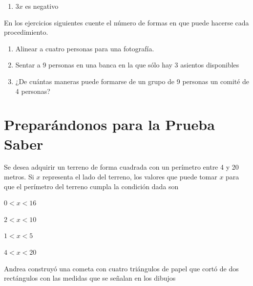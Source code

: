 \documentclass[fleqn]{article}
\begin{document}
\begin{enumerate}
\begin{enumerate}
    \item $3x$ es negativo 
  \end{enumerate}
    \item En los ejercicios siguientes cuente el número de formas en que puede hacerse cada procedimiento.
  \begin{enumerate}
  \item Alinear a cuatro personas para una fotografía.
  \item Sentar a 9 personas en una banca en la que sólo hay 3 asientos disponibles
  \item ¿De cuántas maneras puede formarse de un grupo de 9 personas un comité de 4 personas?
  \end{enumerate}
   \section*{Preparándonos para la Prueba Saber}
\item Se desea adquirir un terreno de forma cuadrada con un perímetro entre 4 y 20 metros. Si $x$ representa el lado del terreno, los valores que puede tomar $x$ para que el
perímetro del terreno cumpla la condición dada son
\begin{enumerate}
\begin{multicols}{4}
\item $0<x<16$
\item $2<x<10$
\item $1<x<5$
\item $4<x<20$
\end{multicols}
\end{enumerate}
\begin{minipage}{.4\textwidth}
\item Andrea construyó una cometa con cuatro triángulos de papel que cortó de dos rectángulos con las medidas que se señalan en los dibujos
\end{minipage}
\begin{minipage}{.55\textwidth}
\end{minipage}


\end{enumerate}
\end{document}
